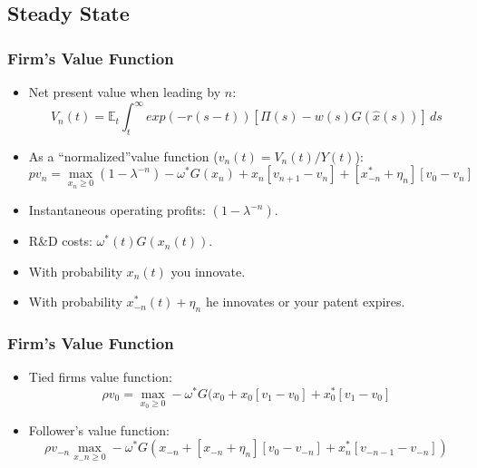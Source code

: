 \documentclass{beamer}
\begin{document}
\subsection{Steady State}
\label{sub:steady_state}
\begin{frame}[t]\frametitle{Firm's Value Function} 
  \begin{itemize}
    \item Net present value when leading by $n$:
      \begin{equation*}
        V_n(t) = \mathbb{E}_t \int_{t}^{\infty} exp(-r(s - t))[\Pi(s) - w(s)G(\hat{x}(s))]\,ds 
      \end{equation*}
    \item As a ``normalized''value function ($v_n(t) = V_n(t) / Y(t)$):
      \begin{equation*} \label{eq:rvf_leader}  %
          pv_n = \max_{x_n \geq 0} (1 - \lambda^{-n}) - \omega^*G(x_n) + x_n[v_{n+1} - v_n] + [x_{-n}^* + \eta_n][v_0 - v_n]
        \end{equation*}
    \item Instantaneous operating profits: $(1 - \lambda^{-n})$.
    \item R\&D costs: $\omega^*(t)G(x_n(t))$.
    \item With probability $x_n(t)$ you innovate.
    \item With probability $x_{-n}^*(t) + \eta_n$ he innovates or your patent expires.
  \end{itemize}
\end{frame}

\begin{frame}[t]\frametitle{Firm's Value Function} 
  \begin{itemize}
    \item Tied firms value function:
      \begin{equation*} \label{eq:rvf_tied}
        \rho v_0 = \max_{x_0 \geq 0} -\omega^*G(x_{0} + x_{0}[v_1 - v_0] + x_0^*[v_{1} - v_0]
      \end{equation*}

    \item Follower's value function:
      \begin{equation*} \label{eq:rvf_follower}
        \rho v_{-n} \max_{x_-n \geq 0} -\omega^*G(x_{-n} + [x_{-n} + \eta_n][v_0 - v_{-n}] + x_n^*[v_{-n-1} - v_{-n}])
      \end{equation*}
  \end{itemize}
\end{frame}
\end{document}
